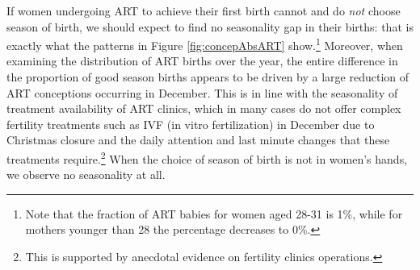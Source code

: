 \documentclass[a4paper, 11.5 pt]{article}
\theoremstyle{plain}
\begin{document}
\begin{doublespace}
If women undergoing ART to achieve their first birth cannot and do \emph{not} choose season of birth, we should expect to find no seasonality gap in their births: that is exactly what the patterns in Figure \ref{fig:concepAbsART} show.\footnote{Note that the fraction of ART babies for women aged 28-31 is 1\%, while for mothers younger than 28 the percentage decreases to 0\%.} Moreover, when examining the distribution of ART births over the year, the entire difference in the proportion of good season births appears to be driven by a large reduction of ART conceptions occurring in December. This is in line with the seasonality of treatment availability of ART clinics, which in many cases do not offer complex fertility treatments such as IVF (in vitro fertilization) in December due to Christmas closure and the daily attention and last minute changes that these treatments require.\footnote{ This is supported by anecdotal evidence on fertility clinics operations.} When the choice of season of birth is not in women's hands, we observe no seasonality at all.


\end{doublespace}
\end{document}
